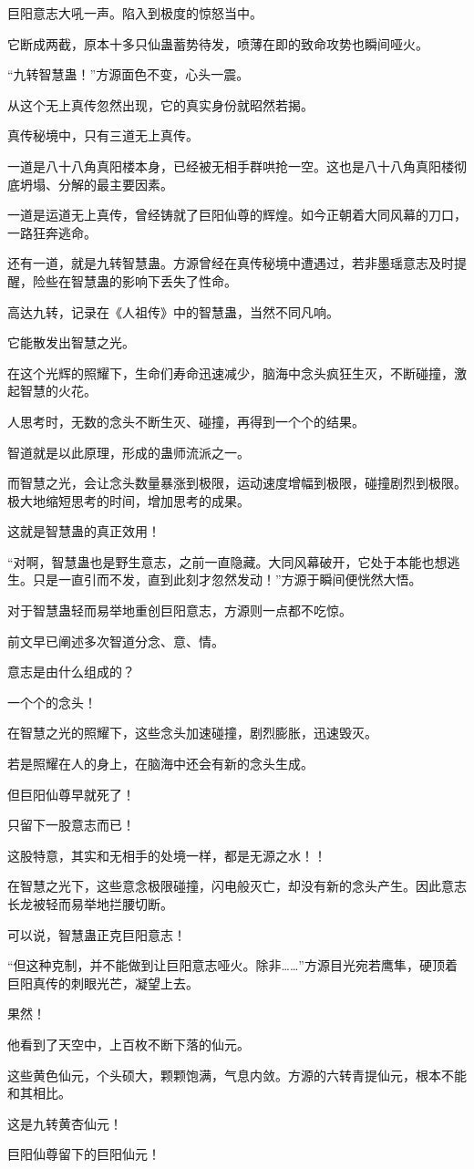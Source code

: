 \begin{this_body}
巨阳意志大吼一声。陷入到极度的惊怒当中。

它断成两截，原本十多只仙蛊蓄势待发，喷薄在即的致命攻势也瞬间哑火。

“九转智慧蛊！”方源面色不变，心头一震。

从这个无上真传忽然出现，它的真实身份就昭然若揭。

真传秘境中，只有三道无上真传。

一道是八十八角真阳楼本身，已经被无相手群哄抢一空。这也是八十八角真阳楼彻底坍塌、分解的最主要因素。

一道是运道无上真传，曾经铸就了巨阳仙尊的辉煌。如今正朝着大同风幕的刀口，一路狂奔逃命。

还有一道，就是九转智慧蛊。方源曾经在真传秘境中遭遇过，若非墨瑶意志及时提醒，险些在智慧蛊的影响下丢失了性命。

高达九转，记录在《人祖传》中的智慧蛊，当然不同凡响。

它能散发出智慧之光。

在这个光辉的照耀下，生命们寿命迅速减少，脑海中念头疯狂生灭，不断碰撞，激起智慧的火花。

人思考时，无数的念头不断生灭、碰撞，再得到一个个的结果。

智道就是以此原理，形成的蛊师流派之一。

而智慧之光，会让念头数量暴涨到极限，运动速度增幅到极限，碰撞剧烈到极限。极大地缩短思考的时间，增加思考的成果。

这就是智慧蛊的真正效用！

“对啊，智慧蛊也是野生意志，之前一直隐藏。大同风幕破开，它处于本能也想逃生。只是一直引而不发，直到此刻才忽然发动！”方源于瞬间便恍然大悟。

对于智慧蛊轻而易举地重创巨阳意志，方源则一点都不吃惊。

前文早已阐述多次智道分念、意、情。

意志是由什么组成的？

一个个的念头！

在智慧之光的照耀下，这些念头加速碰撞，剧烈膨胀，迅速毁灭。

若是照耀在人的身上，在脑海中还会有新的念头生成。

但巨阳仙尊早就死了！

只留下一股意志而已！

这股特意，其实和无相手的处境一样，都是无源之水！！

在智慧之光下，这些意念极限碰撞，闪电般灭亡，却没有新的念头产生。因此意志长龙被轻而易举地拦腰切断。

可以说，智慧蛊正克巨阳意志！

“但这种克制，并不能做到让巨阳意志哑火。除非……”方源目光宛若鹰隼，硬顶着巨阳真传的刺眼光芒，凝望上去。

果然！

他看到了天空中，上百枚不断下落的仙元。

这些黄色仙元，个头硕大，颗颗饱满，气息内敛。方源的六转青提仙元，根本不能和其相比。

这是九转黄杏仙元！

巨阳仙尊留下的巨阳仙元！

\end{this_body}

